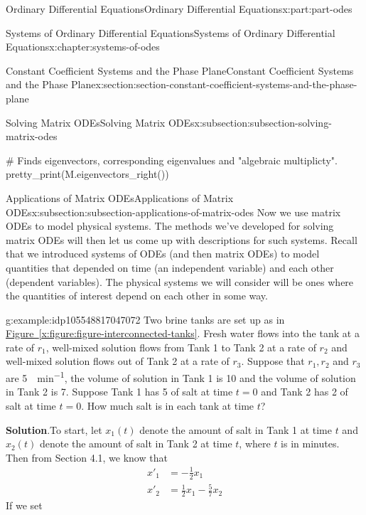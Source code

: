 \documentclass[twoside,10pt,]{book}
\newcommand{\blocktitlefont}{\relax}
\newcommand{\xreffont}{\relax}
\numberwithin{equation}{part}
\newcommand{\amp}{&}
\begin{document}
\begin{partptx}{Ordinary Differential Equations}{}{Ordinary Differential Equations}{}{}{x:part:part-odes}
\begin{chapterptx}{Systems of Ordinary Differential Equations}{}{Systems of Ordinary Differential Equations}{}{}{x:chapter:systems-of-odes}
\begin{sectionptx}{Constant Coefficient Systems and the Phase Plane}{}{Constant Coefficient Systems and the Phase Plane}{}{}{x:section:section-constant-coefficient-systems-and-the-phase-plane}
\begin{subsectionptx}{Solving Matrix ODEs}{}{Solving Matrix ODEs}{}{}{x:subsection:subsection-solving-matrix-odes}
\begin{sageinput}
# Finds eigenvectors, corresponding eigenvalues and "algebraic multiplicty".
pretty_print(M.eigenvectors_right())
\end{sageinput}
\end{subsectionptx}
%
%
\typeout{************************************************}
\typeout{************************************************}
%
\begin{subsectionptx}{Applications of Matrix ODEs}{}{Applications of Matrix ODEs}{}{}{x:subsection:subsection-applications-of-matrix-odes}
Now we use matrix ODEs to model physical systems. The methods we've developed for solving matrix ODEs will then let us come up with descriptions for such systems. Recall that we introduced systems of ODEs (and then matrix ODEs) to model quantities that depended on time (an independent variable) and each other (dependent variables). The physical systems we will consider will be ones where the quantities of interest depend on each other in some way.%
\begin{example}{}{g:example:idp105548817047072}%
Two brine tanks are set up as in \hyperref[x:figure:figure-interconnected-tanks]{Figure~{\xreffont\ref{x:figure:figure-interconnected-tanks}}}. Fresh water flows into the tank at a rate of \(r_{1}\), well-mixed solution flows from Tank 1 to Tank 2 at a rate of \(r_{2}\) and well-mixed solution flows out of Tank 2 at a rate of \(r_{3}\). Suppose that \(r_{1}, r_{2}\) and  \(r_{3}\) are \SI{5}{\gallon\per\minute}, the volume of solution in Tank 1 is \SI{10}{\gallon} and the volume of solution in Tank 2 is \SI{7}{\gallon}. Suppose Tank 1 has \SI{5}{\pound} of salt at time \(t=0\) and Tank 2 has \SI{2}{\pound} of salt at time \(t=0\). How much salt is in each tank at time \(t\)?%
\par\smallskip%
\noindent\textbf{\blocktitlefont Solution}.\hypertarget{g:solution:idp105548817055264}{}\quad{}To start, let \(x_{1}(t)\) denote the amount of salt in Tank 1 at time \(t\) and \(x_{2}(t)\) denote the amount of salt in Tank 2 at time \(t\), where \(t\) is in minutes. Then from Section 4.1, we know that%
\begin{align*}
x'_{1} \amp = -\frac{1}{2}x_{1}\\
x'_{2} \amp = \frac{1}{2}x_{1}-\frac{5}{7}x_{2}
\end{align*}
If we set%
\begin{equation*}

\end{equation*}
\end{example}
\end{subsectionptx}
\end{sectionptx}
\end{chapterptx}
\end{partptx}
\end{document}
